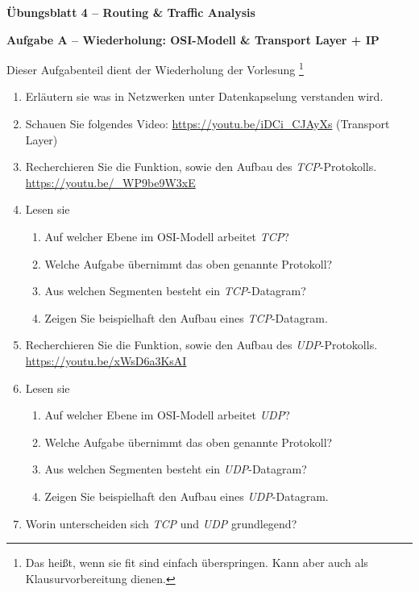 \documentclass[paper=a4,fontsize=11pt]{scrartcl}%
\numberwithin{equation}{section}
\begin{document}
\begin{center}
\Large{\textbf{Übungsblatt 4 -- Routing \& Traffic Analysis}}
\end{center}

\begin{center}\Large{\textbf{Aufgabe A -- Wiederholung: OSI-Modell \& Transport Layer + IP}}\end{center}\vskip0.25in
Dieser Aufgabenteil dient der Wiederholung der Vorlesung \footnote{Das heißt, wenn sie fit sind einfach überspringen. Kann aber auch als Klausurvorbereitung dienen.}
\begin{enumerate}
	\item Erläutern sie was in Netzwerken unter Datenkapselung verstanden wird.
	\item Schauen Sie folgendes Video: \url{https://youtu.be/iDCi_CJAyXs} (Transport Layer)
	\item Recherchieren Sie die Funktion, sowie den Aufbau des \emph{TCP}-Protokolls.\\
	\url{https://youtu.be/_WP9be9W3xE}
	\item Lesen sie \cite[Kap. 3.1, 3.4]{Kurose2012}
	\begin{enumerate}
		\item Auf welcher Ebene im OSI-Modell arbeitet \emph{TCP}?
		\item Welche Aufgabe übernimmt das oben genannte Protokoll?
		\item Aus welchen Segmenten besteht ein \emph{TCP}-Datagram?
		\item Zeigen Sie beispielhaft den Aufbau eines \emph{TCP}-Datagram.
	\end{enumerate}
	\item Recherchieren Sie die Funktion, sowie den Aufbau des \emph{UDP}-Protokolls.\\
	\url{https://youtu.be/xWsD6a3KsAI}
	\item Lesen sie \cite[Kap. 3.3]{Kurose2012}
	\begin{enumerate}
		\item Auf welcher Ebene im OSI-Modell arbeitet \emph{UDP}?
		\item Welche Aufgabe übernimmt das oben genannte Protokoll?
		\item Aus welchen Segmenten besteht ein \emph{UDP}-Datagram?
		\item Zeigen Sie beispielhaft den Aufbau eines \emph{UDP}-Datagram.
	\end{enumerate}
	\item Worin unterscheiden sich \emph{TCP} und \emph{UDP} grundlegend?

\end{enumerate}
\end{document}

